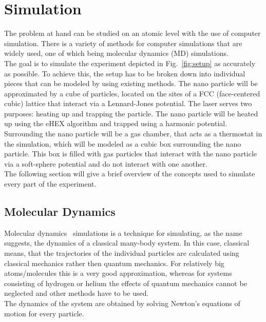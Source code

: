 \documentclass[12pt]{article}
\begin{document}





\newpage
\section{Simulation}
The problem at hand can be studied on an atomic level with the use of computer simulation. There is a variety of methods for computer simulations
that are widely used, one of which being molecular dynamics (MD) simulations.\\ 
The goal is to simulate the experiment depicted in Fig.~\ref{fig:setup} as accurately as possible. To achieve this, the setup has to be broken down
into individual pieces that can be modeled by using existing methods. The nano particle will be approximated by a cube of particles, located on the
sites of a FCC
(face-centered cubic) lattice that interact via a Lennard-Jones potential. The laser serves two purposes: heating up and trapping the particle. The 
nano particle will be heated up using the eHEX algorithm and trapped using a harmonic potential.
Surrounding the nano particle will be a gas chamber, 
that acts as a thermostat in the simulation, which will be modeled as a cubic box surrounding the nano particle. 
This box is filled with gas particles that interact with the nano particle via a soft-sphere potential and do not interact with one another.\\
The following section will give a brief overview of the concepts used to simulate every part of the experiment.


\subsection{Molecular Dynamics}
Molecular dynamics~\cite{Frenkel2001} simulations is a technique for simulating, as the name suggests, the dynamics of a classical many-body system. In this case,
classical means, that the trajectories of the individual particles are calculated using classical mechanics rather then quantum mechanics. For
relatively big atoms/molecules this is a very good approximation, whereas for systems consisting of hydrogen or helium the effects of quantum
mechanics cannot be neglected and other methods have to be used.\\
The dynamics of the system are obtained by solving Newton's equations of motion for every particle. 
\end{document}
